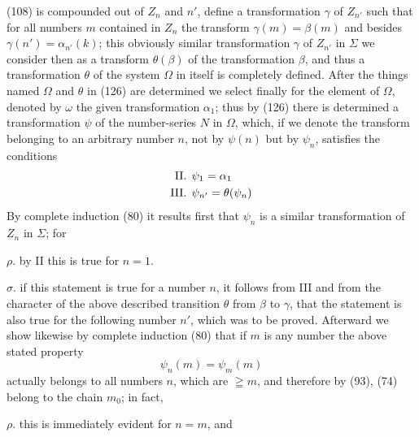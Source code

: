 \documentclass[oneside]{book}
\begin{document}
(108) is compounded out of $Z_n$ and $n'$, define a transformation
$\gamma$ of $Z_{n'}$ such that for all numbers $m$ contained
in $Z_n$ the transform $\gamma(m)=\beta(m)$ and besides
$\gamma(n')=\alpha_{n'}(k)$; this obviously similar transformation $\gamma$
of $Z_{n'}$ in $\Sigma$ we consider then as a transform $\theta(\beta)$ of the
transformation $\beta$, %
and thus a transformation $\theta$ of the
system $\Omega$ in itself is completely defined. After the
things named $\Omega$ and $\theta$ in (126) are determined we select
finally for the element of $\Omega$, denoted by $\omega$ the given
transformation $\alpha_1$; thus by (126) there is determined
a transformation $\psi$ of the number-series $N$ in $\Omega$, which,
if we denote the transform belonging to an arbitrary
number $n$, not by $\psi(n)$ but by $\psi_n$, satisfies the conditions
\begin{align*}
\text{II\@. }& \psi_1=\alpha_1\\
\text{III\@. }& \psi_{n'}=\theta(\psi_n)
\end{align*}
By complete induction (80) it results first that $\psi_n$ is a
similar transformation of $Z_n$ in $\Sigma$; for

$\rho$. by II this is true for $n =1$.

$\sigma$. if this statement is true for a number $n$, it follows
from III and from the character of the above described
transition $\theta$ from $\beta$ to $\gamma$, that the statement is
also true for the following number $n'$, which was to be
proved. Afterward we show likewise by complete induction
(80) that if $m$ is any number the above stated
property
\[
\psi_n(m)=\psi_m(m)
\]
actually belongs to all numbers $n$, which are $\geqq m$, and
therefore by (93), (74) belong to the chain $m_0$; in
fact,

$\rho$. this is immediately evident for $n = m$, and
\end{document}
